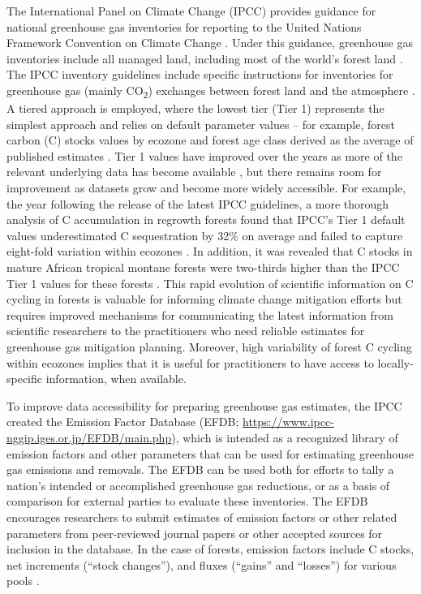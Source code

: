 \documentclass[, manuscript]{copernicus}
\begin{document}
The International Panel on Climate Change (IPCC) provides guidance for
national greenhouse gas inventories for reporting to the United Nations
Framework Convention on Climate Change
\citep[UNFCCC,][]{ipcc_2006_2006, ipcc_2019_2019}. Under this guidance,
greenhouse gas inventories include all managed land, including most of
the world's forest land \citep{ogle_delineating_2018}. The IPCC
inventory guidelines include specific instructions for inventories for
greenhouse gas (mainly CO\textsubscript{2}) exchanges between forest
land and the atmosphere \citep{ipcc_agriculture_2006, ipcc_2019_2019}. A
tiered approach is employed, where the lowest tier (Tier 1) represents
the simplest approach and relies on default parameter values -- for
example, forest carbon (C) stocks values by ecozone
\citep{fao_global_2012} and forest age class derived as the average of
published estimates \citep{ipcc_2019_2019, rozendaal_aboveground_2022}.
Tier 1 values have improved over the years as more of the relevant
underlying data has become available
\citep{requenasuarez_estimating_2019, rozendaal_aboveground_2022}, but
there remains room for improvement as datasets grow and become more
widely accessible. For example, the year following the release of the
latest IPCC guidelines, a more thorough analysis of C accumulation in
regrowth forests found that IPCC's Tier 1 default values underestimated
C sequestration by 32\% on average and failed to capture eight-fold
variation within ecozones \citep{cook-patton_mapping_2020}. In addition,
it was revealed that C stocks in mature African tropical montane forests
were two-thirds higher than the IPCC Tier 1 values for these forests
\citep{cuni-sanchez_high_2021}. This rapid evolution of scientific
information on C cycling in forests is valuable for informing climate
change mitigation efforts but requires improved mechanisms for
communicating the latest information from scientific researchers to the
practitioners who need reliable estimates for greenhouse gas mitigation
planning. Moreover, high variability of forest C cycling within ecozones
\citep[e.g.,][]{cook-patton_mapping_2020, cuni-sanchez_high_2021}
implies that it is useful for practitioners to have access to
locally-specific information, when available.

To improve data accessibility for preparing greenhouse gas estimates,
the IPCC created the Emission Factor Database (EFDB;
\url{https://www.ipcc-nggip.iges.or.jp/EFDB/main.php}), which is
intended as a recognized library of emission factors and other
parameters that can be used for estimating greenhouse gas emissions and
removals. The EFDB can be used both for efforts to tally a nation's
intended or accomplished greenhouse gas reductions, or as a basis of
comparison for external parties to evaluate these inventories. The EFDB
encourages researchers to submit estimates of emission factors or other
related parameters from peer-reviewed journal papers or other accepted
sources for inclusion in the database. In the case of forests, emission
factors include C stocks, net increments (``stock changes''), and fluxes
(``gains'' and ``losses'') for various pools
\citep{ipcc_2006_2006, ipcc_2019_2019}.
\end{document}
